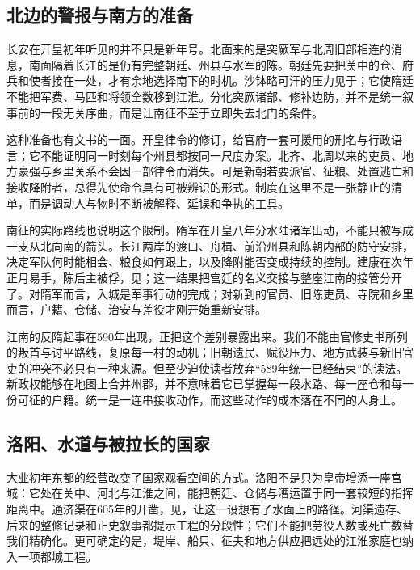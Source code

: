 \subsection{北边的警报与南方的准备}
长安在开皇初年听见的并不只是新年号。北面来的是突厥军与北周旧部相连的消息，南面隔着长江的是仍有完整朝廷、州县与水军的陈。朝廷先要把关中的仓、府兵和使者接在一处，才有余地选择南下的时机。沙钵略可汗的压力见于；它使隋廷不能把军费、马匹和将领全数移到江淮。分化突厥诸部、修补边防，并不是统一叙事前的一段无关序曲，而是让南征不至于立即失去北门的条件。

这种准备也有文书的一面。开皇律令的修订，给官府一套可援用的刑名与行政语言；它不能证明同一时刻每个州县都按同一尺度办案。北齐、北周以来的吏员、地方豪强与乡里关系不会因一部律令而消失。可是新朝若要派官、征粮、处置逃亡和接收降附者，总得先使命令具有可被辨识的形式。制度在这里不是一张静止的清单，而是调动人与物时不断被解释、延误和争执的工具。

南征的实际路线也说明这个限制。隋军在开皇八年分水陆诸军出动，不能只被写成一支从北向南的箭头。长江两岸的渡口、舟楫、前沿州县和陈朝内部的防守安排，决定军队何时能相会、粮食如何跟上，以及降附能否变成持续的控制。建康在次年正月易手，陈后主被俘，见；这一结果把宫廷的名义交接与整座江南的接管分开了。对隋军而言，入城是军事行动的完成；对新到的官员、旧陈吏员、寺院和乡里而言，户籍、仓储、治安与差役才刚开始重新安排。

江南的反隋起事在590年出现，正把这个差别暴露出来。我们不能由官修史书所列的叛首与讨平路线，复原每一村的动机；旧朝遗民、赋役压力、地方武装与新旧官吏的冲突不必只有一种来源。但至少迫使读者放弃“589年统一已经结束”的读法。新政权能够在地图上合并州郡，并不意味着它已掌握每一段水路、每一座仓和每一份可征的户籍。统一是一连串接收动作，而这些动作的成本落在不同的人身上。

\subsection{洛阳、水道与被拉长的国家}
大业初年东都的经营改变了国家观看空间的方式。洛阳不是只为皇帝增添一座宫城：它处在关中、河北与江淮之间，能把朝廷、仓储与漕运置于同一套较短的指挥距离中。通济渠在605年的开凿，见，让这一设想有了水面上的路径。河渠遗存、后来的整修记录和正史叙事都提示工程的分段性；它们不能把劳役人数或死亡数替我们精确化。更可确定的是，堤岸、船只、征夫和地方供应把远处的江淮家庭也纳入一项都城工程。

